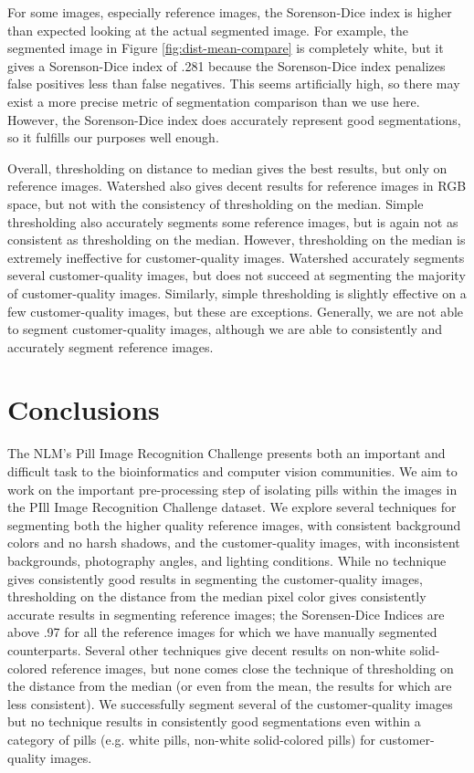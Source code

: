 \documentclass{article}
\begin{document}
For some images, especially reference images, the Sorenson-Dice index is higher than expected looking at the actual segmented image. For example, the segmented image in Figure \ref{fig:dist-mean-compare} is completely white, but it gives a Sorenson-Dice index of .281 because the Sorenson-Dice index penalizes false positives less than false negatives. This seems artificially high, so there may exist a more precise metric of segmentation comparison than we use here. However, the Sorenson-Dice index does accurately represent good segmentations, so it fulfills our purposes well enough. 

Overall, thresholding on distance to median gives the best results, but only on reference images. Watershed also gives decent results for reference images in RGB space, but not with the consistency of thresholding on the median. Simple thresholding also accurately segments some reference images, but is again not as consistent as thresholding on the median. However, thresholding on the median is extremely ineffective for customer-quality images. Watershed accurately segments several customer-quality images, but does not succeed at segmenting the majority of customer-quality images. Similarly, simple thresholding is slightly effective on a few customer-quality images, but these are exceptions. Generally, we are not able to segment customer-quality images, although we are able to consistently and accurately segment reference images.

\section{Conclusions}
\label{conclusions}

The NLM’s Pill Image Recognition Challenge presents both an important and difficult task to the bioinformatics and computer vision communities. We aim to work on the important pre-processing step of isolating pills within the images in the PIll Image Recognition Challenge dataset. We explore several techniques for segmenting both the higher quality reference images, with consistent background colors and no harsh shadows, and the customer-quality images, with inconsistent backgrounds, photography angles, and lighting conditions. While no technique gives consistently good results in segmenting the customer-quality images, thresholding on the distance from the median pixel color gives consistently accurate results in segmenting reference images; the Sorensen-Dice Indices are above .97 for all the reference images for which we have manually segmented counterparts. Several other techniques give decent results on non-white solid-colored reference images, but none comes close the technique of thresholding on the distance from the median (or even from the mean, the results for which are less consistent). We successfully segment several of the customer-quality images but no technique results in consistently good segmentations even within a category of pills (e.g. white pills, non-white solid-colored pills) for customer-quality images. 
\end{document}
